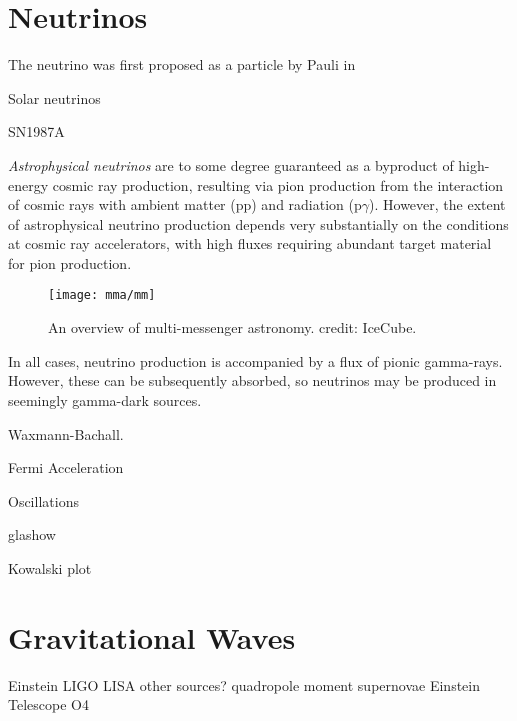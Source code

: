 \section{Neutrinos}

The neutrino was first proposed as a particle by Pauli in 

Solar neutrinos

SN1987A

\emph{Astrophysical neutrinos} are to some degree guaranteed as a byproduct of high-energy cosmic ray production, resulting via pion production from the interaction of cosmic rays with ambient matter (pp) and radiation (p$\gamma$). However, the extent of astrophysical neutrino production depends very substantially on the conditions at cosmic ray accelerators, with high fluxes requiring abundant target material for pion production.

\begin{figure}[!ht]
	\centering \texttt{[image: mma/mm]}
	\caption{An overview of multi-messenger astronomy. credit: IceCube.}
	\label{fig:mm}
\end{figure}

In all cases, neutrino production is accompanied by a flux of pionic gamma-rays. However, these can be subsequently absorbed, so neutrinos may be produced in seemingly gamma-dark sources.

Waxmann-Bachall.

Fermi Acceleration

Oscillations

glashow

Kowalski plot

\section{Gravitational Waves}

Einstein
LIGO
LISA
other sources?
quadropole moment
supernovae
Einstein Telescope
O4